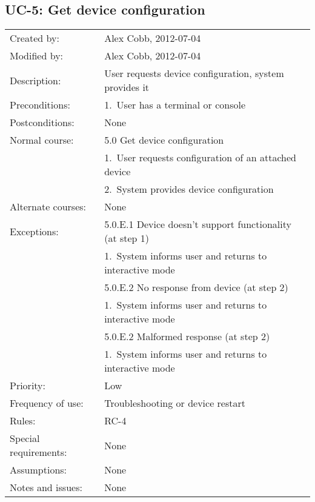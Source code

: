\documentclass[pdftex,oneside,12pt,a4paper]{book}
\begin{document}
\subsection{UC-5: Get device configuration}
\begin{tabular}{|l|p{10cm}|}\hline
Created by: & Alex Cobb, 2012-07-04 \\
Modified by: & Alex Cobb, 2012-07-04 \\\hline
Description: & User requests device configuration, system provides it \\\hline
Preconditions: & 1.\ User has a terminal or console \\\hline
Postconditions: & None \\\hline
Normal course: & 5.0 Get device configuration\\
 & 1.\ User requests configuration of an attached device \\
 & 2.\ System provides device configuration\\\hline
Alternate courses: & None \\\hline
Exceptions: & 5.0.E.1 Device doesn't support functionality (at step 1)\\
 & 1.\ System informs user and returns to interactive mode\\\cline{2-2}
 & 5.0.E.2 No response from device (at step 2) \\
 & 1.\ System informs user and returns to interactive mode\\\cline{2-2}
 & 5.0.E.2 Malformed response (at step 2)\\
 & 1.\ System informs user and returns to interactive mode\\\hline
Priority: & Low \\\hline
Frequency of use: & Troubleshooting or device restart\\\hline
Rules: & RC-4\\\hline
Special requirements: & None\\\hline
Assumptions: & None\\\hline
Notes and issues: & None\\\hline
\end{tabular}
\end{document}
